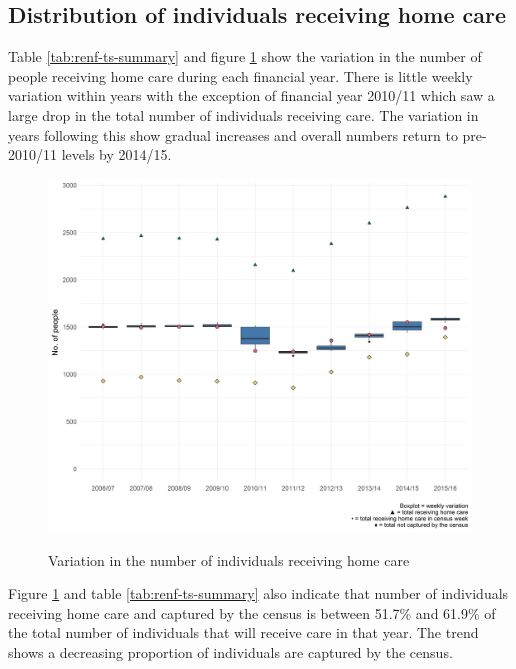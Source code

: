 \documentclass[]{article}
\begin{document}
\FloatBarrier

\subsection{Distribution of individuals receiving home care}\label{renf-results-ts}

Table \ref{tab:renf-ts-summary} and figure \ref{fig:renf-hrs} show the
variation in the number of people receiving home care during each
financial year. There is little weekly variation within years with the
exception of financial year 2010/11 which saw a large drop in the total
number of individuals receiving care. The variation in years following
this show gradual increases and overall numbers return to pre-2010/11
levels by 2014/15.

\begin{figure}[h]
  \centering
    \caption{Variation in the number of individuals receiving home care}
    \includegraphics{figures/chapter-renf/06-indivdual-weekly-variation.png}
    \label{fig:renf-hrs}
\end{figure}

Figure \ref{fig:renf-hrs} and table \ref{tab:renf-ts-summary} also
indicate that number of individuals receiving home care and captured by
the census is between 51.7\% and 61.9\% of the total number of
individuals that will receive care in that year. The trend shows a
decreasing proportion of individuals are captured by the census.
\end{document}
